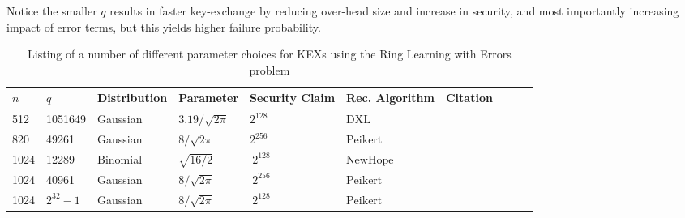 \begin{plain}
\normalfont
Notice the smaller $q$ results in faster key-exchange by reducing over-head size and increase in security, and most importantly increasing impact of error terms, but this yields higher failure probability.
\end{plain}



\begin{table}[H]
	\centering
	\begin{adjustbox}{width=1\textwidth}
		\small
		\begin{tabular}{|l|l|l|l|l|l|l|l|l|l|}
			\hline
			$n$  & $q$        & Distribution & Parameter            & Security Claim & Rec. Algorithm     & Citation                      \\ \hline
			512  & 1051649    & Gaussian     & $3.19 / \sqrt{2\pi}$ & $2^{128}$      & $\mathrm{DXL}$     & \cite{cryptoeprint:2015:008}  \\ \hline
			820  & 49261      & Gaussian     & $8 / \sqrt{2\pi}$    & $2^{256}$      & $\mathrm{Peikert}$ & \cite{cryptoeprint:2015:1120} \\ \hline
			1024 & 12289      & Binomial     & $\sqrt{{16} / {2}}$  & $\> 2^{128}$   & $\mathrm{NewHope}$ & \cite{alkim2015post}          \\ \hline
			1024 & 40961      & Gaussian     & $8 / \sqrt{2\pi}$    & $\> 2^{256}$   & $\mathrm{Peikert}$ & \cite{cryptoeprint:2015:1120} \\ \hline
			1024 & $2^{32}-1$ & Gaussian     & $8 / \sqrt{2\pi}$    & $\> 2^{128}$   & $\mathrm{Peikert}$ & \cite{bos2015post}            \\ \hline
		\end{tabular}
	\end{adjustbox}
	\caption{Listing of a number of different parameter choices for KEXs using the Ring Learning with Errors problem}
\end{table} 
